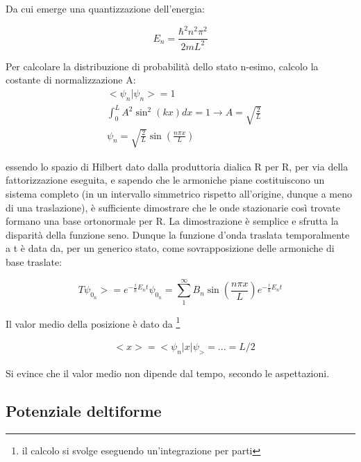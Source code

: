 \documentclass{article}
\begin{document}
Da cui emerge una quantizzazione dell'energia:

\begin{equation}
    E_n=\frac{\hbar^2n^2\pi^2}{2mL^2}
\end{equation}

Per calcolare la distribuzione di probabilità dello stato n-esimo, calcolo la costante di normalizzazione A:
\begin{equation}
    \begin{aligned}
         & <\psi_n | \psi_n>=1                                              \\
         & \int_{0}^{L} A^2\sin^2(kx)dx=1  \rightarrow A=\sqrt{\frac{2}{L}} \\
         & \psi_n=\sqrt{\frac{2}{L}}\sin(\frac{n\pi x}{L})
    \end{aligned}
\end{equation}

essendo lo spazio di Hilbert dato dalla produttoria dialica R per R, per via della fattorizzazione eseguita, e sapendo che le armoniche piane costituiscono un sistema completo (in un intervallo simmetrico rispetto all'origine, dunque a meno di una traslazione),
è sufficiente dimostrare che le onde stazionarie così trovate formano una base ortonormale per R.
La dimostrazione è semplice e sfrutta la disparità della funzione seno.
Dunque la funzione d'onda traslata temporalmente a t è data da, per un generico stato, come sovrapposizione delle armoniche di base traslate:

\begin{equation}
    T\psi_{0_n}>= e^{-\frac{i}{\hbar}E_nt}\psi_{0_n}= \sum_{1}^{\infty} B_n \sin(\frac{n\pi x}{L})e^{-\frac{i}{\hbar}E_nt}
\end{equation}

Il valor medio della posizione è dato da \footnote{il calcolo si svolge eseguendo un'integrazione per parti}

\begin{equation}
    \begin{aligned}
         & <x>=<\psi_n |x|\psi_>=...=L/2
    \end{aligned}
\end{equation}

Si evince che il valor medio non dipende dal tempo, secondo le aspettazioni.

\subsection{Potenziale deltiforme}
\end{document}
